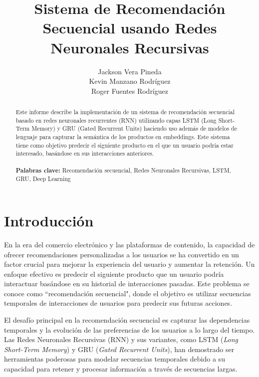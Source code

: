 \documentclass[runningheads]{llncs}
\newcommand{\keywords}[1]{\\ \\ \textbf{Palabras clave:} #1}
\begin{document}
\title{Sistema de Recomendación Secuencial usando Redes Neuronales Recursivas}
\author{Jackson Vera Pineda \\ Kevin Manzano Rodríguez \\ Roger Fuentes Rodríguez}


\maketitle

\begin{abstract}
Este informe describe la implementación de un sistema de recomendación secuencial basado en redes neuronales recurrentes (RNN) utilizando capas LSTM (Long Short-Term Memory) y GRU (Gated Recurrent Units) haciendo uso además de modelos de lenguaje para capturar la semántica de los productos en embeddings. Este sistema tiene como objetivo predecir el siguiente producto en el que un usuario podría estar interesado, basándose en sus interacciones anteriores.
\keywords{Recomendación secuencial, Redes Neuronales Recursivas, LSTM, GRU, Deep Learning}
\end{abstract}


\section{Introducción}

\space En la era del comercio electrónico y las plataformas de contenido, la capacidad de ofrecer recomendaciones personalizadas a los usuarios se ha convertido en un factor crucial para mejorar la experiencia del usuario y aumentar la retención. Un enfoque efectivo es predecir el siguiente producto que un usuario podría interactuar basándose en su historial de interacciones pasadas. Este problema se conoce como ``recomendación secuencial", donde el objetivo es utilizar secuencias temporales de interacciones de usuarios para predecir sus futuras acciones.

El desafío principal en la recomendación secuencial es capturar las dependencias temporales y la evolución de las preferencias de los usuarios a lo largo del tiempo. Las Redes Neuronales Recursivas (RNN) y sus variantes, como LSTM (\textit{Long Short-Term Memory}) y GRU (\textit{Gated Recurrent Units}), han demostrado ser herramientas poderosas para modelar secuencias temporales debido a su capacidad para retener y procesar información a través de secuencias largas.
\end{document}
